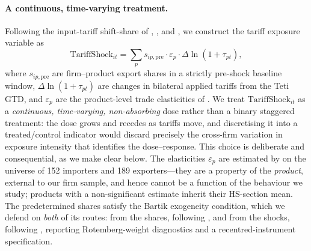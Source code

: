 \paragraph{A continuous, time-varying treatment.}
Following the input-tariff shift-share of \citet{amiti2007}, \citet{topalova2011}, and
\citet{tomasi2022}, we construct the tariff exposure variable as
\[
  \text{TariffShock}_{it}
  = \sum_p s_{ip,\text{pre}}\cdot \varepsilon_p \cdot \Delta\ln(1+\tau_{pt}),
\]
where $s_{ip,\text{pre}}$ are firm--product export shares in a strictly pre-shock
baseline window, $\Delta\ln(1+\tau_{pt})$ are changes in bilateral applied tariffs
from the Teti GTD, and $\varepsilon_p$ are the product-level trade elasticities of
\citet{fontagne2022}. We treat $\text{TariffShock}_{it}$ as a \emph{continuous,
time-varying, non-absorbing} dose rather than a binary staggered treatment: the dose
grows and recedes as tariffs move, and discretising it into a treated/control
indicator would discard precisely the cross-firm variation in exposure intensity that
identifies the dose--response. This choice is deliberate and consequential, as we make
clear below. The elasticities $\varepsilon_p$ are estimated by \citet{fontagne2022} on
the universe of 152 importers and 189 exporters---they are a property of the
\emph{product}, external to our firm sample, and hence cannot be a function of the
behaviour we study; products with a non-significant estimate inherit their HS-section
mean. The predetermined shares satisfy the Bartik exogeneity condition, which we defend
on \emph{both} of its routes: from the shares, following \citet{goldsmithpinkham2020},
and from the shocks, following \citet{borusyakhull2022}, reporting Rotemberg-weight
diagnostics and a recentred-instrument specification.


